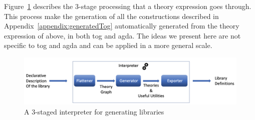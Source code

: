 Figure~\ref{fig:staged-interpreter} describes the $3$-stage processing that a theory expression goes through. This process make the generation of all the constructions described in Appendix~\ref{appendix:generatedTog} automatically generated from the theory expression of  above, in both tog and agda. The ideas we present here are not specific to tog and agda and can be applied in a more general scale. 
\begin{figure}
\includegraphics[scale=0.5,width=\linewidth]{figures/interpreter_detailed}
\caption{A $3$-staged interpreter for generating libraries}
\label{fig:staged-interpreter}
\end{figure} 

